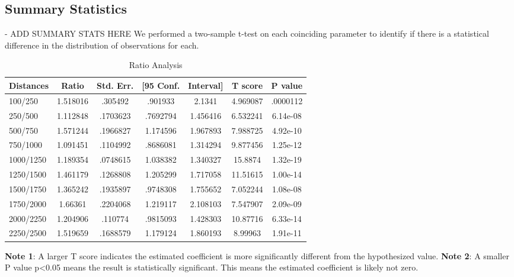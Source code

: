 \documentclass[12pt]{article}
\begin{document}
\subsection{Summary Statistics}
- ADD SUMMARY STATS HERE
We performed a two-sample t-test on each coinciding parameter to identify if there is a statistical difference in the distribution of observations for each. 

\begin{table}[h]
\centering
\caption{Ratio Analysis}
\begin{tabular}{l|c|c|cc|c|c}
\hline\hline
Distances   &       Ratio&   Std. Err.&  [95 Conf.&   Interval]&     T score&     P value\\
\hline
100/250     &    1.518016&     .305492&     .901933&      2.1341&    4.969087&    .0000112\\
250/500     &    1.112848&    .1703623&    .7692794&    1.456416&    6.532241&    6.14e-08\\
500/750     &    1.571244&    .1966827&    1.174596&    1.967893&    7.988725&    4.92e-10\\
750/1000    &    1.091451&    .1104992&    .8686081&    1.314294&    9.877456&    1.25e-12\\
1000/1250   &    1.189354&    .0748615&    1.038382&    1.340327&     15.8874&    1.32e-19\\
1250/1500   &    1.461179&    .1268808&    1.205299&    1.717058&    11.51615&    1.00e-14\\
1500/1750   &    1.365242&    .1935897&    .9748308&    1.755652&    7.052244&    1.08e-08\\
1750/2000   &     1.66361&    .2204068&    1.219117&    2.108103&    7.547907&    2.09e-09\\
2000/2250   &    1.204906&     .110774&    .9815093&    1.428303&    10.87716&    6.33e-14\\
2250/2500  &    1.519659&    .1688579&    1.179124&    1.860193&     8.99963&    1.91e-11\\
\hline\hline
\end{tabular}
\flushleft
\begin{footnotesize}
\begin{singlespace}
\textbf{Note 1}: A larger T score indicates the estimated coefficient is more significantly different from the hypothesized value.
\textbf{Note 2}: A smaller P value p<0.05 means the result is statistically significant. This means the estimated coefficient is likely not zero.
\end{singlespace}
\end{footnotesize}
\end{table}
\end{document}
